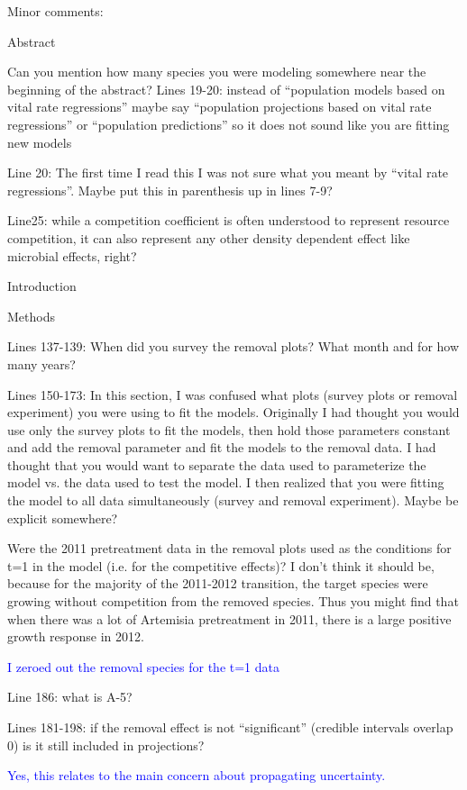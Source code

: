 \documentclass[12pt]{article}
\newcommand{\response}{\textcolor{blue}}
\begin{document}
{Minor comments:

Abstract

Can you mention how many species you were modeling somewhere near the beginning of the abstract?
Lines 19-20: instead of “population models based on vital rate regressions” maybe say “population projections based on vital rate regressions” or “population predictions” so it does not sound like you are fitting new models

Line 20: The first time I read this I was not sure what you meant by “vital rate regressions”. Maybe put this in parenthesis up in lines 7-9?

Line25: while a competition coefficient is often understood to represent resource competition, it can also represent any other density dependent effect like microbial effects, right?


Introduction

Methods

Lines 137-139:  When did you survey the removal plots? What month and for how many years? 

Lines 150-173: In this section, I was confused what plots (survey plots or removal experiment) you were using to fit the models. Originally I had thought you would use only the survey plots to fit the models, then hold those parameters constant and add the removal parameter and fit the models to the removal data. I had thought that you would want to separate the data used to parameterize the model vs. the data used to test the model. I then realized that you were fitting the model to all data simultaneously (survey and removal experiment). Maybe be explicit somewhere? 

Were the 2011 pretreatment data in the removal plots used as the conditions for t=1 in the model (i.e. for the competitive effects)? I don’t think it should be, because for the majority of the 2011-2012 transition, the target species were growing without competition from the removed species. Thus you might find that when there was a lot of Artemisia pretreatment in 2011, there is a large positive growth response in 2012.

\response{I zeroed out the removal species for the t=1 data}

Line 186: what is A-5?

Lines 181-198: if the removal effect is not “significant” (credible intervals overlap 0) is it still included in projections?

\response{Yes, this relates to the main concern about propagating uncertainty.}

}
\end{document}
